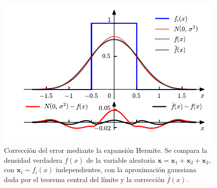\documentclass[a4paper]{report}
\newcommand{\x}{\mathbf{x}}
\begin{document}
\begin{figure}[!htb]
  \begin{minipage}[c]{0.7\textwidth}
    \includegraphics[width=\textwidth]{figuras/example_7_17.pdf}
  \end{minipage}\hfill
  \begin{minipage}[c]{0.25\textwidth}
    \caption{
      Corrección del error mediante la expansión Hermite. Se compara la densidad verdadera \(f(x)\) de la variable aleatoria \(\x=\x_1+\x_2+\x_2\), con \(\x_i\sim f_i(x)\) independientes, con la aproximación gaussiana dada por el teorema central del límite y la corrección \(\bar{f}(x)\).
    }\label{fig:example_7_17}
  \end{minipage}
\end{figure}
\end{document}
